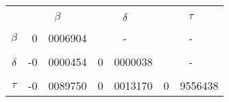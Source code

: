 		

		\begin{tabular}{cr@{.}lr@{.}lr@{.}l}
		& \multicolumn{2}{c}{ } & \multicolumn{2}{c}{ } & \multicolumn{2}{c}{ } \\
		& \multicolumn{2}{c}{{\bf{$\beta$}}} & \multicolumn{2}{c}{{\bf{$\delta$}}} & \multicolumn{2}{c}{{\bf{$\tau$}}} \\
		& \multicolumn{2}{c}{ } & \multicolumn{2}{c}{ } & \multicolumn{2}{c}{ } \\
		{\bf{$\beta$}} &			 0&0006904		&	\multicolumn{2}{c}{ - }		&  \multicolumn{2}{c}{ - }	\\
		& \multicolumn{2}{c}{ } & \multicolumn{2}{c}{ } & \multicolumn{2}{c}{ } \\
		 {\bf{$\delta$}} &			-0&0000454		&	0&0000038				& \multicolumn{2}{c}{ - } \\
		& \multicolumn{2}{c}{ } & \multicolumn{2}{c}{ } & \multicolumn{2}{c}{ } \\
		 {\bf{$\tau$}} &			-0&0089750		&	0&0013170				& 0&9556438 \\
		\end{tabular}
